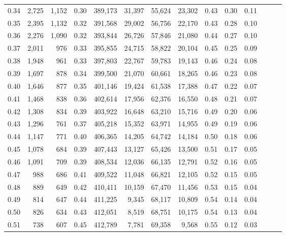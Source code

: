 \begin{tabular}{rrrrrrrrrrrrrr}
0.34 &   2,725 &  1,152 &  0.30 &  389,173 &   31,397 &  55,624 &  23,302 &  0.43 &  0.30 &      0.11 \\
0.35 &   2,395 &  1,132 &  0.32 &  391,568 &   29,002 &  56,756 &  22,170 &  0.43 &  0.28 &      0.10 \\
0.36 &   2,276 &  1,090 &  0.32 &  393,844 &   26,726 &  57,846 &  21,080 &  0.44 &  0.27 &      0.10 \\
0.37 &   2,011 &    976 &  0.33 &  395,855 &   24,715 &  58,822 &  20,104 &  0.45 &  0.25 &      0.09 \\
0.38 &   1,948 &    961 &  0.33 &  397,803 &   22,767 &  59,783 &  19,143 &  0.46 &  0.24 &      0.08 \\
0.39 &   1,697 &    878 &  0.34 &  399,500 &   21,070 &  60,661 &  18,265 &  0.46 &  0.23 &      0.08 \\
0.40 &   1,646 &    877 &  0.35 &  401,146 &   19,424 &  61,538 &  17,388 &  0.47 &  0.22 &      0.07 \\
0.41 &   1,468 &    838 &  0.36 &  402,614 &   17,956 &  62,376 &  16,550 &  0.48 &  0.21 &      0.07 \\
0.42 &   1,308 &    834 &  0.39 &  403,922 &   16,648 &  63,210 &  15,716 &  0.49 &  0.20 &      0.06 \\
0.43 &   1,296 &    761 &  0.37 &  405,218 &   15,352 &  63,971 &  14,955 &  0.49 &  0.19 &      0.06 \\
0.44 &   1,147 &    771 &  0.40 &  406,365 &   14,205 &  64,742 &  14,184 &  0.50 &  0.18 &      0.06 \\
0.45 &   1,078 &    684 &  0.39 &  407,443 &   13,127 &  65,426 &  13,500 &  0.51 &  0.17 &      0.05 \\
0.46 &   1,091 &    709 &  0.39 &  408,534 &   12,036 &  66,135 &  12,791 &  0.52 &  0.16 &      0.05 \\
0.47 &     988 &    686 &  0.41 &  409,522 &   11,048 &  66,821 &  12,105 &  0.52 &  0.15 &      0.05 \\
0.48 &     889 &    649 &  0.42 &  410,411 &   10,159 &  67,470 &  11,456 &  0.53 &  0.15 &      0.04 \\
0.49 &     814 &    647 &  0.44 &  411,225 &    9,345 &  68,117 &  10,809 &  0.54 &  0.14 &      0.04 \\
0.50 &     826 &    634 &  0.43 &  412,051 &    8,519 &  68,751 &  10,175 &  0.54 &  0.13 &      0.04 \\
0.51 &     738 &    607 &  0.45 &  412,789 &    7,781 &  69,358 &   9,568 &  0.55 &  0.12 &      0.03 \\

\end{tabular}

